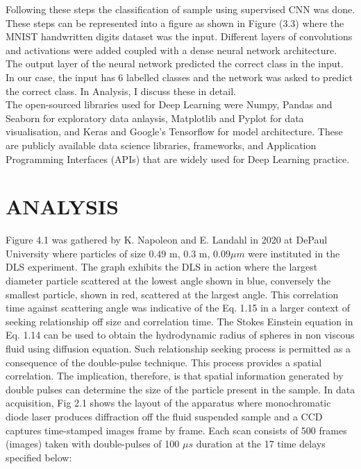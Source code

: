 Following these steps the classification of sample using supervised CNN was done. These steps can be represented into a figure as shown in Figure (3.3) where the MNIST handwritten digits dataset was the input. Different layers of convolutions and activations were added coupled with a dense neural network architecture. The output layer of the neural network predicted the correct class in the input. In our case, the input has 6 labelled classes and the network was asked to predict the correct class. In Analysis, I discuss these in detail. \\

The open-sourced libraries used for Deep Learning were Numpy, Pandas and Seaborn for exploratory data anlaysis, Matplotlib and Pyplot for data visualisation, and Keras and Google's Tensorflow for model architecture. These are publicly available data science libraries, frameworks, and Application Programming Interfaces (APIs) that are widely used for Deep Learning practice. 


\chapter{ANALYSIS}


Figure 4.1 was gathered by K. Napoleon and E. Landahl in 2020 at DePaul University where particles of size $0.49$ \mu m, $ 0.3 $ \mu m, $ 0.09 \mu m$ were instituted in the DLS experiment. The graph exhibits the DLS in action where the largest diameter particle scattered at the lowest angle shown in blue, conversely the smallest particle, shown in red, scattered at the largest angle. This correlation time against scattering angle was indicative of the Eq. 1.15 in a larger context of seeking relationship off size and correlation time. The Stokes Einstein equation in Eq. 1.14 can be used to obtain the hydrodynamic radius of spheres in non viscous fluid using diffusion equation. Such relationship seeking process is permitted as a consequence of the double-pulse technique. This process provides a spatial correlation\citep{LeeS}. The implication, therefore, is that spatial information generated by double pulses can determine the size of the particle present in the sample. In data acquisition, Fig 2.1 shows the layout of the apparatus where monochromatic diode laser produces diffraction off the fluid suspended sample and a CCD captures time-stamped images frame by frame. Each scan consists of 500 frames (images) taken with double-pulses of 100 $\mu s$ duration at the 17 time delays specified below: \\

